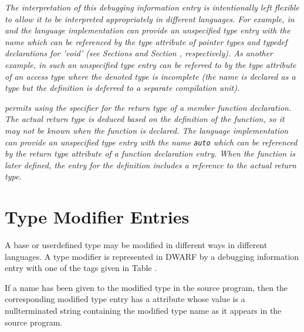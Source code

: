 \textit{The interpretation of this debugging information entry is
intentionally left flexible to allow it to be interpreted
appropriately in different languages. For example, in 
 and 
the language implementation can provide an unspecified type
entry with the name  which can be referenced by the
type attribute of pointer types and typedef declarations for
'void' (see 
Sections  and 
Section , 
respectively). As another
example, in  such an unspecified type entry can be referred
to by the type attribute of an access type where the denoted
type is incomplete (the name is declared as a type but the
definition is deferred to a separate compilation unit).}

\textit{ permits using the 
\autoreturntype{} specifier for the return type of a member function declaration. 
The actual return type is deduced based on the definition of the 
function, so it may not be known when the function is declared.  The language 
implementation can provide an unspecified type entry with the name \texttt{auto} which 
can be referenced by the return type attribute of a function declaration entry.  
When the function is later defined, the \DWTAGsubprogram{} entry for the definition
includes a reference to the actual return type.}


\section{Type Modifier Entries}
\label{chap:typemodifierentries}
A base or user\dash defined type may be modified in different ways
in different languages. A type modifier is represented in
DWARF by a debugging information entry with one of the tags
given in Table .

If a name has been given to the modified type in the source
program, then the corresponding modified type entry has
a \DWATname{} attribute 
whose value is a null\dash terminated
string containing the modified type name as it appears in
the source program.

